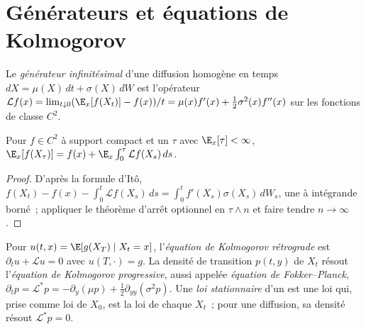\section{Générateurs et équations de Kolmogorov}

\begin{definition}\label{def:qm:stochastic-differential-equations:generator}
Le \emph{générateur infinitésimal} d'une
diffusion homogène en temps $dX = \mu(X)\,dt + \sigma(X)\,dW$ est l'opérateur $\mathcal Lf(x) = \lim_{t\downarrow 0}
(\E_x[f(X_t)] - f(x))/t = \mu(x)f'(x) + \tfrac12\sigma^2(x)f^{\prime\prime}(x)$ sur les fonctions de classe $C^2$.
\end{definition}

\begin{proposition}\label{prop:qm:stochastic-differential-equations:dynkin}
Pour $f \in C^2$ à support compact et un  $\tau$ avec $\E_x[\tau] < \infty$,
$\E_x[f(X_\tau)] = f(x) + \E_x\int_0^\tau\mathcal Lf(X_s)\,ds$.
\end{proposition}

\begin{proof}
D'après la formule d'Itô, $f(X_t) - f(x) - \int_0^t\mathcal Lf(X_s)\,ds = \int_0^tf'(X_s)\sigma(X_s)\,dW_s$, une
 à intégrande borné~; appliquer le théorème d'arrêt optionnel en $\tau \wedge n$ et faire tendre $n \to \infty$.
\end{proof}

\begin{definition}\label{def:qm:stochastic-differential-equations:kolmogorov}
Pour $u(t, x) = \E[g(X_T) \mid X_t = x]$, l'\emph{équation de Kolmogorov rétrograde}
est $\partial_tu + \mathcal Lu = 0$ avec $u(T, \cdot) = g$. La densité de transition
$p(t, y)$ de $X_t$ résout l'\emph{équation de Kolmogorov progressive},
aussi appelée \emph{équation de Fokker--Planck}, $\partial_tp =
\mathcal L^*p = -\partial_y(\mu p) + \tfrac12\partial_{yy}(\sigma^2p)$. Une \emph{loi stationnaire} d'un 
est une loi qui, prise comme loi de
$X_0$, est la loi de chaque $X_t$~; pour une diffusion, sa densité résout $\mathcal L^*p = 0$.
\end{definition}

